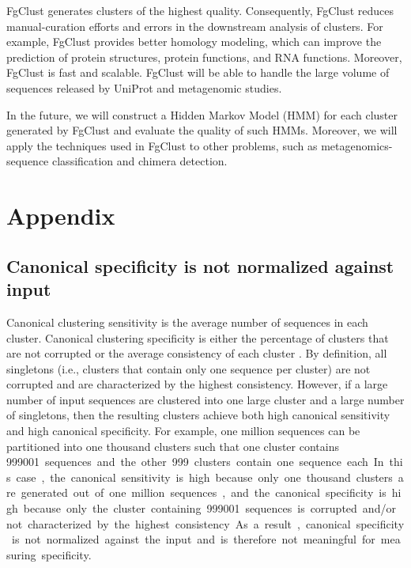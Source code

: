 \documentclass[11pt,letterpaper]{article}
\begin{document}
FgClust generates clusters of the highest quality. 
Consequently, FgClust reduces manual-curation efforts and errors in the downstream analysis of clusters.
For example, FgClust provides better homology modeling, which can improve the prediction of protein structures, protein functions, and RNA functions.
Moreover, FgClust is fast and scalable.
FgClust will be able to handle the large volume of sequences released by UniProt and metagenomic studies.

In the future, we will construct a Hidden Markov Model (HMM) for each cluster generated by FgClust and evaluate the quality of such HMMs.
Moreover, we will apply the techniques used in FgClust to other problems, such as metagenomics-sequence classification and chimera detection.%


%


\clearpage{}

\appendix

\section{Appendix}
\subsection{Canonical specificity is not normalized against input}
\label{sec:appendix:canonical-specificity}
Canonical clustering sensitivity is the average number of sequences in each cluster.
Canonical clustering specificity is either the percentage of clusters that are not corrupted \citep{hauser2013kclust} or the average consistency of each cluster \citep{hauser2016mmseqs,steinegger2017mmseqs2,steinegger2017linclust}.
By definition, all singletons (i.e., clusters that contain only one sequence per cluster) are not corrupted and are characterized by the highest consistency.
However, if a large number of input sequences are clustered into one large cluster and a large number of singletons, then the resulting clusters achieve both high canonical sensitivity and high canonical specificity.
For example, one million sequences can be partitioned into one thousand clusters such that one cluster contains \SI{999001} sequences and the other \SI{999} clusters contain one sequence each.
In this case, 
the canonical sensitivity is high because only one thousand clusters are generated out of one million sequences, 
and the canonical specificity is high because only the cluster containing \SI{999001} sequences is corrupted and/or not characterized by the highest consistency.
As a result, canonical specificity is not normalized against the input and is therefore not meaningful for measuring specificity.
\end{document}
